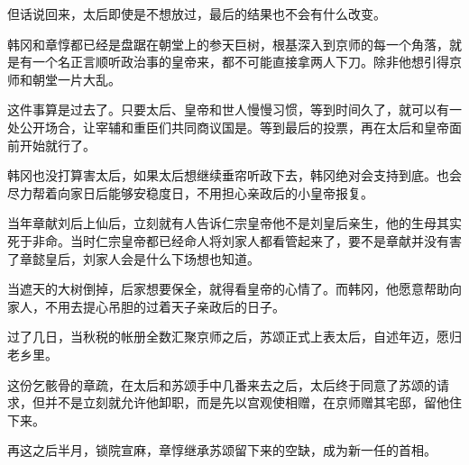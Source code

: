 但话说回来，太后即使是不想放过，最后的结果也不会有什么改变。

韩冈和章惇都已经是盘踞在朝堂上的参天巨树，根基深入到京师的每一个角落，就是有一个名正言顺听政治事的皇帝来，都不可能直接拿两人下刀。除非他想引得京师和朝堂一片大乱。

这件事算是过去了。只要太后、皇帝和世人慢慢习惯，等到时间久了，就可以有一处公开场合，让宰辅和重臣们共同商议国是。等到最后的投票，再在太后和皇帝面前开始就行了。

韩冈也没打算害太后，如果太后想继续垂帘听政下去，韩冈绝对会支持到底。也会尽力帮着向家日后能够安稳度日，不用担心亲政后的小皇帝报复。

当年章献刘后上仙后，立刻就有人告诉仁宗皇帝他不是刘皇后亲生，他的生母其实死于非命。当时仁宗皇帝都已经命人将刘家人都看管起来了，要不是章献并没有害了章懿皇后，刘家人会是什么下场想也知道。

当遮天的大树倒掉，后家想要保全，就得看皇帝的心情了。而韩冈，他愿意帮助向家人，不用去提心吊胆的过着天子亲政后的日子。

过了几日，当秋税的帐册全数汇聚京师之后，苏颂正式上表太后，自述年迈，愿归老乡里。

这份乞骸骨的章疏，在太后和苏颂手中几番来去之后，太后终于同意了苏颂的请求，但并不是立刻就允许他卸职，而是先以宫观使相赠，在京师赠其宅邸，留他住下来。

再这之后半月，锁院宣麻，章惇继承苏颂留下来的空缺，成为新一任的首相。

